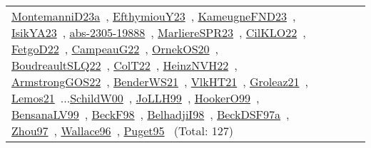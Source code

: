 {\begin{longtable}{p{3cm}r>{\raggedright\arraybackslash}p{6cm}>{\raggedright\arraybackslash}p{6cm}>{\raggedright\arraybackslash}p{8cm}}
\href{../works/MontemanniD23a.pdf}{MontemanniD23a}~\cite{MontemanniD23a}, \href{../works/EfthymiouY23.pdf}{EfthymiouY23}~\cite{EfthymiouY23}, \href{../works/KameugneFND23.pdf}{KameugneFND23}~\cite{KameugneFND23}, \href{../works/IsikYA23.pdf}{IsikYA23}~\cite{IsikYA23}, \href{../works/abs-2305-19888.pdf}{abs-2305-19888}~\cite{abs-2305-19888}, \href{../works/MarliereSPR23.pdf}{MarliereSPR23}~\cite{MarliereSPR23}, \href{../works/CilKLO22.pdf}{CilKLO22}~\cite{CilKLO22}, \href{../works/FetgoD22.pdf}{FetgoD22}~\cite{FetgoD22}, \href{../works/CampeauG22.pdf}{CampeauG22}~\cite{CampeauG22}, \href{../works/OrnekOS20.pdf}{OrnekOS20}~\cite{OrnekOS20}, \href{../works/BoudreaultSLQ22.pdf}{BoudreaultSLQ22}~\cite{BoudreaultSLQ22}, \href{../works/ColT22.pdf}{ColT22}~\cite{ColT22}, \href{../works/HeinzNVH22.pdf}{HeinzNVH22}~\cite{HeinzNVH22}, \href{../works/ArmstrongGOS22.pdf}{ArmstrongGOS22}~\cite{ArmstrongGOS22}, \href{../works/BenderWS21.pdf}{BenderWS21}~\cite{BenderWS21}, \href{../works/VlkHT21.pdf}{VlkHT21}~\cite{VlkHT21}, \href{../works/Groleaz21.pdf}{Groleaz21}~\cite{Groleaz21}, \href{../works/Lemos21.pdf}{Lemos21}~\cite{Lemos21}...\href{../works/SchildW00.pdf}{SchildW00}~\cite{SchildW00}, \href{../works/JoLLH99.pdf}{JoLLH99}~\cite{JoLLH99}, \href{../works/HookerO99.pdf}{HookerO99}~\cite{HookerO99}, \href{../works/BensanaLV99.pdf}{BensanaLV99}~\cite{BensanaLV99}, \href{../works/BeckF98.pdf}{BeckF98}~\cite{BeckF98}, \href{../works/BelhadjiI98.pdf}{BelhadjiI98}~\cite{BelhadjiI98}, \href{../works/BeckDSF97a.pdf}{BeckDSF97a}~\cite{BeckDSF97a}, \href{../works/Zhou97.pdf}{Zhou97}~\cite{Zhou97}, \href{../works/Wallace96.pdf}{Wallace96}~\cite{Wallace96}, \href{../works/Puget95.pdf}{Puget95}~\cite{Puget95} (Total: 127)\\

\end{longtable}}
